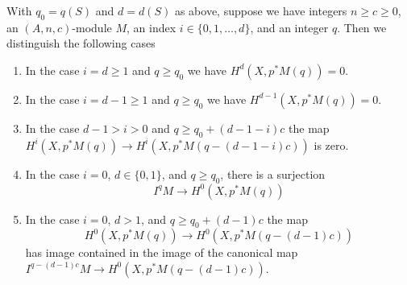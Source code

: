 %
\begin{lemma}
\label{lemma-vanishing-coh-almost-projective}
With $q_0 = q(S)$ and $d = d(S)$ as above, suppose we have
integers $n \geq c \geq 0$, an $(A, n, c)$-module $M$,
an index $i \in \{0, 1, \ldots, d\}$, and an integer $q$.
Then we distinguish the following cases
\begin{enumerate}
\item In the case $i = d \geq 1$ and $q \geq q_0$ we have
$H^d(X, p^*M(q)) = 0$.
\item In the case $i = d - 1 \geq 1$ and $q \geq q_0$ we have
$H^{d - 1}(X, p^*M(q)) = 0$.
\item In the case $d - 1 > i > 0$ and $q \geq q_0 + (d - 1 - i)c$
the map
$H^i(X, p^*M(q)) \to H^i(X, p^*M(q - (d - 1 - i)c))$
is zero.
\item In the case $i = 0$, $d \in \{0, 1\}$, and $q \geq q_0$, there
is a surjection
$$
I^qM \longrightarrow H^0(X, p^*M(q))
$$
\item In the case $i = 0$, $d > 1$, and $q \geq q_0 + (d - 1)c$ the map
$$
H^0(X, p^*M(q)) \to H^0(X, p^*M(q - (d - 1)c))
$$
has image contained in the image of the canonical map
$I^{q - (d - 1)c}M \to H^0(X, p^*M(q - (d - 1)c))$.
\end{enumerate}
\end{lemma}

